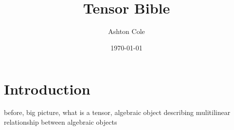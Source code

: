 \documentclass{book}
\title{Tensor Bible}
\author{Ashton Cole}
\date{\today}
\begin{document}
\frontmatter

\maketitle

\tableofcontents

\listoftheorems

\mainmatter

\chapter*{Introduction}

before, big picture, what is a tensor, algebraic object describing mulitilinear relationship between algebraic objects \cite{mnistdata}

































\appendix



\backmatter



\end{document}
